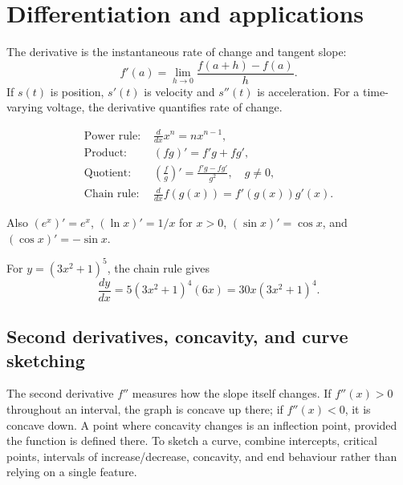 \documentclass[12pt,a4paper]{article}
\begin{document}
\section{Differentiation and applications}
The derivative is the instantaneous rate of change and tangent slope:
\[
f'(a)=\lim_{h\to0}\frac{f(a+h)-f(a)}{h}.
\]
If $s(t)$ is position, $s'(t)$ is velocity and $s''(t)$ is acceleration. For a time-varying voltage, the derivative quantifies rate of change.
\begin{formulaBox}
\begin{align*}
\text{Power rule: }&\frac{d}{dx}x^n=nx^{n-1},\\
\text{Product: }&(fg)'=f'g+fg',\\
\text{Quotient: }&\left(\frac fg\right)'=\frac{f'g-fg'}{g^2},\quad g\ne0,\\
\text{Chain rule: }&\frac{d}{dx}f(g(x))=f'(g(x))g'(x).
\end{align*}
\end{formulaBox}
Also $(e^x)'=e^x$, $(\ln x)'=1/x$ for $x>0$, $(\sin x)'=\cos x$, and $(\cos x)'=-\sin x$.
\begin{exampleBox}For $y=(3x^2+1)^5$, the chain rule gives
\[
\frac{dy}{dx}=5(3x^2+1)^4(6x)=30x(3x^2+1)^4.
\]
\end{exampleBox}
\begin{center}\end{center}
\subsection{Second derivatives, concavity, and curve sketching}
The second derivative $f''$ measures how the slope itself changes. If $f''(x)>0$ throughout an interval, the graph is concave up there; if $f''(x)<0$, it is concave down. A point where concavity changes is an inflection point, provided the function is defined there. To sketch a curve, combine intercepts, critical points, intervals of increase/decrease, concavity, and end behaviour rather than relying on a single feature.
\end{document}

